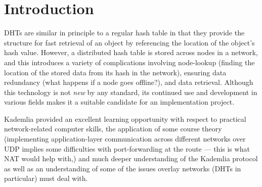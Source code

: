 \documentclass[12pt]{report}
\begin{document}
	
	
	\pagebreak %
	
	\tableofcontents
	
	\pagebreak

    \section{Introduction\label{introduction}}
    DHTs are similar in principle to a regular hash table in that they provide
    the structure for fast retrieval of an object by referencing the location
    of the object's hash value.  However, a distributed hash table is stored
    across nodes in a network, and this introduces a variety of complications
    involving node-lookup (finding the location of the stored data from its
    hash in the network), ensuring data redundancy (what happens if a node goes
    offline?), and data retrieval.  Although this technology is not
    \textit{new} by any standard, its continued use and development in various
    fields makes it a suitable candidate for an implementation project.

    Kademlia provided an excellent learning opportunity with respect to
    practical network-related computer skills, the application of some course
    theory (implementing application-layer communication across different
    networks over UDP implies some difficulties with port-forwarding at the
    route --- this is what NAT would help with,) and much deeper understanding
    of the Kademlia protocol as well as an understanding of some of the issues
    overlay networks (DHTs in particular) must deal with.
   
\end{document}
